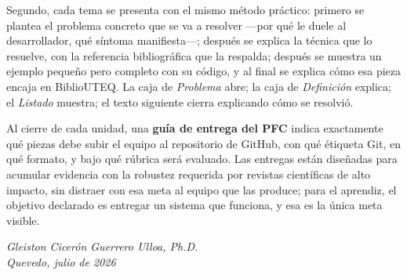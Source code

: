 \documentclass[11pt,a4paper,twoside,openright]{book}
\newcommand{\termino}[1]{\textbf{\textcolor{uteqverdeo}{#1}}}
\begin{document}
Segundo, cada tema se presenta con el mismo m\'etodo pr\'actico: primero se plantea el problema concreto que se va a resolver ---por qu\'e le duele al desarrollador, qu\'e s\'intoma manifiesta---; despu\'es se explica la t\'ecnica que lo resuelve, con la referencia bibliogr\'afica que la respalda; despu\'es se muestra un ejemplo peque\~no pero completo con su c\'odigo, y al final se explica c\'omo esa pieza encaja en BiblioUTEQ. La caja de \textit{Problema} abre; la caja de \textit{Definici\'on} explica; el \textit{Listado} muestra; el texto siguiente cierra explicando c\'omo se resolvi\'o.

Al cierre de cada unidad, una \termino{gu\'ia de entrega del PFC} indica exactamente qu\'e piezas debe subir el equipo al repositorio de GitHub, con qu\'e \'etiqueta Git, en qu\'e formato, y bajo qu\'e r\'ubrica ser\'a evaluado. Las entregas est\'an dise\~nadas para acumular evidencia con la robustez requerida por revistas cient\'ificas de alto impacto, sin distraer con esa meta al equipo que las produce; para el aprendiz, el objetivo declarado es entregar un sistema que funciona, y esa es la \'unica meta visible.

\vspace{6pt}
\begin{flushright}
    \itshape Gleiston Cicer\'on Guerrero Ulloa, Ph.D.\\[2pt]
    Quevedo, julio de 2026
\end{flushright}
\cleardoublepage

\tableofcontents
\cleardoublepage

\listoffigures
\cleardoublepage

\listoftables
\cleardoublepage

\lstlistoflistings
\cleardoublepage

\setcounter{page}{1}











\cleardoublepage
{}
{}
\printbibliography[heading=bibnumbered,title={Bibliograf\'ia}]
\end{document}
